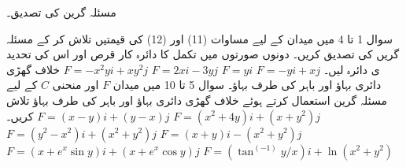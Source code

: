 مسئلہ گرین کی تصدیق۔

سوال 1 تا 4 میں میدان 
 کے لیے مساوات (11) اور (12) کی قیمتیں تلاش کر کے مسئلہ گریں کی تصدیق کریں۔ دونوں صورتوں میں تکمل کا دائرہ کار قرص  
 اور اس کی تحدید ی دائرہ 
 لیں۔
\(
F = -yi + xj
\)
\(
F = yi
\)
\(
F = 2xi - 3yj
\)
\(
F = -x^2yi + xy^2j
\)
خلاف گهڑی دائری بہاؤ اور باہر کی طرف بہاؤ۔ سوال 5 تا 10 میں میدان $F$ اور منحنی $C$ کے لیے مسئلہ گرین استعمال کرتے ہوئے خلاف گھڑی دائری بہاؤ اور باہر کی طرف بہاؤ تلاش کریں۔
\(
F = (x - y)i + (y - x)j 
\)
\(
F = (x^2 + 4y)i + (x + y^2)j
\)
\(
F = (y^2 - x^2)i + (x^2 + y^2)j
\)
\(
F = (x + y)i - (x^2 + y^2)j
\)
\(
F = (x + e^x \sin y)i + (x + e^x \cos y)j
\)
\(
F = (\tan^(-1) y/x)i + \ln(x^2 + y^2 )
\)

